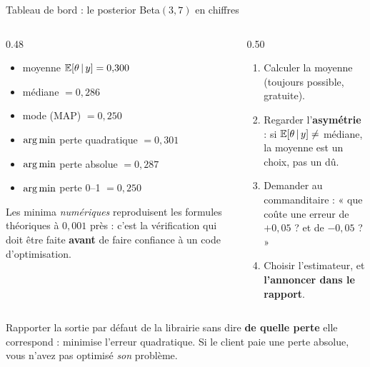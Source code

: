 \begin{frame}{Tableau de bord : le posterior Beta$(3,7)$ en chiffres}
\small
\vspace{-1mm}
\begin{columns}[t]
\begin{column}{0.48\textwidth}
\begin{ebox}
\begin{itemize}
  \item moyenne $\mathbb{E}[\theta \,\vert\, y] = 0{,}300$
  \item médiane $= 0{,}286$
  \item mode (MAP) $= 0{,}250$
  \item $\operatorname*{arg\,min}$ perte quadratique $= 0{,}301$
  \item $\operatorname*{arg\,min}$ perte absolue $= 0{,}287$
  \item $\operatorname*{arg\,min}$ perte 0--1 $= 0{,}250$
\end{itemize}
\vspace{1mm}
\footnotesize Les minima \emph{numériques} reproduisent les formules théoriques à
$0{,}001$ près : c'est la vérification qui doit être faite \textbf{avant} de faire
confiance à un code d'optimisation.
\end{ebox}
\end{column}
\begin{column}{0.50\textwidth}
\begin{kbox}
\begin{enumerate}
  \item Calculer la moyenne (toujours possible, gratuite).
  \item Regarder l'\textbf{asymétrie} : si
        $\mathbb{E}[\theta \,\vert\, y] \neq $ médiane, la moyenne est un choix, pas un dû.
  \item Demander au commanditaire : « que coûte une erreur de $+0{,}05$ ? et de $-0{,}05$ ? »
  \item Choisir l'estimateur, et \textbf{l'annoncer dans le rapport}.
\end{enumerate}
\end{kbox}
\end{column}
\end{columns}
\vspace{1mm}
\begin{wbox}
Rapporter la sortie par défaut de la librairie sans dire \textbf{de quelle perte}
elle correspond :  minimise l'erreur quadratique. Si le client paie
une perte absolue, vous n'avez pas optimisé \emph{son} problème.
\end{wbox}
\end{frame}


